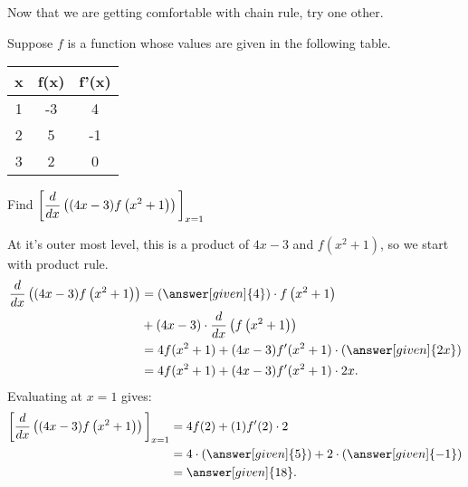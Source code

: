 \documentclass{ximera}
\begin{document}
Now that we are getting comfortable with chain rule, try one other.
\begin{example}
	Suppose $f$ is a function whose values are given in the following table.
	\begin{center}
		\begin{tabular}{c c c}
			\hline \hline
			x & f(x) & f'(x) \\ 
			\hline
			1 & -3 & 4\\
			2 & 5 & -1\\
			3 & 2 & 0\\
			\hline
		\end{tabular}		
	\end{center}
	
	Find $\displaystyle \bigg[  \frac{d}{\mathop{}\!d x}\left( (4x-3) f\left( x^2+1\right) \right) \bigg]_{x=1}$
	\begin{explanation}
	At it's outer most level, this is a product of $4x-3$ and $f\left(x^2+1\right)$, so we start with product rule.
		\begin{align*}
			\ddx\left( (4x-3) f\left( x^2+1\right) \right) &= (\answer[given]{4} ) \cdot f\left( x^2+1\right) \\ &+ (4x-3) \cdot \ddx \left( f\left( x^2+1\right) \right) \\
				&= 4 f(x^2+1) + (4x-3) f'( x^2+1 ) \cdot (\answer[given]{2x} )\\
				&= 4 f(x^2 + 1) + (4x-3) f'(x^2+1) \cdot 2x.
		\end{align*}
		Evaluating at $x=1$ gives:
		\begin{align*}
			\eval{ \ddx\left( (4x-3) f\left( x^2+1\right) \right)}_{x=1} &= 4 f(2) + (1) f'(2) \cdot 2\\
				&= 4 \cdot ( \answer[given]{5} ) + 2 \cdot (\answer[given]{-1})\\
				&= \answer[given]{18}.
		\end{align*}
	\end{explanation}
\end{example}
\end{document}
